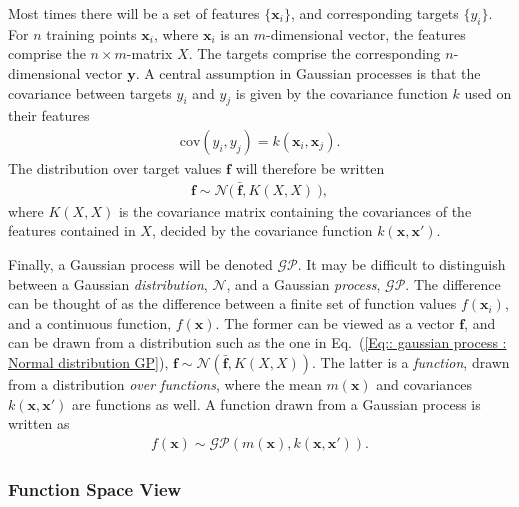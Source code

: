 \documentclass[twoside,english]{uiofysmaster}
\begin{document}
Most times there will be a set of features $\{\textbf{x}_i\}$, and corresponding targets $\{y_i\}$. For $n$ training points $\textbf{x}_i$, where $\textbf{x}_i$ is an $m$-dimensional vector, the features comprise the $n \times m$-matrix $X$. The targets comprise the corresponding $n$-dimensional vector $\textbf{y}$. A central assumption in Gaussian processes is that the covariance between targets $y_i$ and $y_j$ is given by the covariance function $k$ used on their features
\begin{align}
\text{cov}(y_i, y_j) = k(\textbf{x}_i, \textbf{x}_j).
\end{align}
The distribution over target values $\textbf{f}$ will therefore be written
\begin{align}\label{Eq:: gaussian process : Normal distribution GP}
\textbf{f} \sim \mathcal{N} \Big(~\bar{ \textbf{f} }, K(X, X) ~\Big),
\end{align}
where $K(X,X)$ is the covariance matrix containing the covariances of the features contained in $X$, decided by the covariance function $k(\textbf{x}, \textbf{x}')$.

Finally, a Gaussian process will be denoted $\mathcal{GP}$. It may be difficult to distinguish between a Gaussian \textit{distribution}, $\mathcal{N}$, and a Gaussian \textit{process}, $\mathcal{GP}$. The difference can be thought of as the difference between a finite set of function values $f(\textbf{x}_i)$, and a continuous function, $f(\textbf{x})$. The former can be viewed as a vector $\textbf{f}$, and can be drawn from a distribution such as the one in Eq.~(\ref{Eq:: gaussian process : Normal distribution GP}), $\textbf{f} \sim \mathcal{N}(\bar{ \textbf{f} }, K(X, X))$. The latter is a \textit{function}, drawn from a distribution \textit{over functions}, where the mean $m(\textbf{x})$ and covariances $k(\textbf{x}, \textbf{x}')$ are functions as well. A function drawn from a Gaussian process is written as 
\begin{align}
f(\textbf{x}) \sim \mathcal{GP} (m(\textbf{x}), k(\textbf{x}, \textbf{x}')).
\end{align}

\subsubsection{Function Space View}
\end{document}
